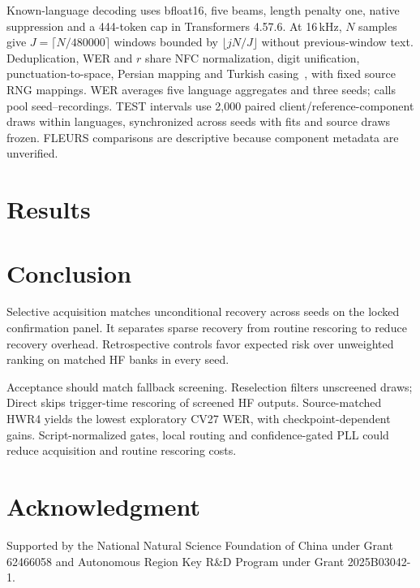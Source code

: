 \documentclass[conference,letterpaper]{IEEEtran}
\begin{document}
Known-language decoding uses bfloat16, five beams, length penalty one, native suppression and a 444-token cap in Transformers 4.57.6. At 16\,kHz, $N$ samples give $J=\lceil N/480000\rceil$ windows bounded by $\lfloor jN/J\rfloor$ without previous-window text. Deduplication, WER and $r$ share NFC normalization, digit unification, punctuation-to-space, Persian mapping and Turkish casing~\cite{normalization}, with fixed source RNG mappings. WER averages five language aggregates and three seeds; calls pool seed--recordings. TEST intervals use 2,000 paired client/reference-component draws within languages, synchronized across seeds with fits and source draws frozen. FLEURS comparisons are descriptive because component metadata are unverified.




\section{Results}

\raggedbottom
\section{Conclusion}
Selective acquisition matches unconditional recovery across seeds on the locked confirmation panel. It separates sparse recovery from routine rescoring to reduce recovery overhead. Retrospective controls favor expected risk over unweighted ranking on matched HF banks in every seed.

Acceptance should match fallback screening. Reselection filters unscreened draws; Direct skips trigger-time rescoring of screened HF outputs. Source-matched HWR4 yields the lowest exploratory CV27 WER, with checkpoint-dependent gains. Script-normalized gates, local routing and confidence-gated PLL could reduce acquisition and routine rescoring costs.

\section*{Acknowledgment}
Supported by the National Natural Science Foundation of China under Grant 62466058 and Autonomous Region Key R\&D Program under Grant 2025B03042-1.
\label{iscas:body-end}\clearpage\raggedbottom\balance
\label{iscas:references-start}

\end{document}
